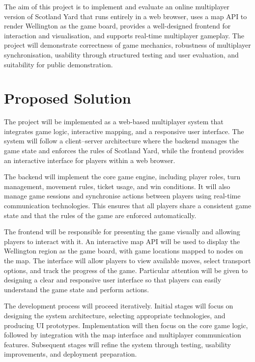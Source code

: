 \documentclass[11pt, a4paper, twoside, openright]{article}
\begin{document}
	The aim of this project is to implement and evaluate an online multiplayer version of Scotland Yard that runs entirely in a web browser, uses a map API to render Wellington as the game board, provides a well-designed frontend for interaction and visualisation, and supports real-time multiplayer gameplay. The project will demonstrate correctness of game mechanics, robustness of multiplayer synchronisation, usability through structured testing and user evaluation, and suitability for public demonstration.
	
	\section{Proposed Solution}
	
	The project will be implemented as a web-based multiplayer system that integrates game logic, interactive mapping, and a responsive user interface. The system will follow a client–server architecture where the backend manages the game state and enforces the rules of Scotland Yard, while the frontend provides an interactive interface for players within a web browser.
	
	The backend will implement the core game engine, including player roles, turn management, movement rules, ticket usage, and win conditions. It will also manage game sessions and synchronise actions between players using real-time communication technologies. This ensures that all players share a consistent game state and that the rules of the game are enforced automatically.
	
	The frontend will be responsible for presenting the game visually and allowing players to interact with it. An interactive map API will be used to display the Wellington region as the game board, with game locations mapped to nodes on the map. The interface will allow players to view available moves, select transport options, and track the progress of the game. Particular attention will be given to designing a clear and responsive user interface so that players can easily understand the game state and perform actions.
	
	The development process will proceed iteratively. Initial stages will focus on designing the system architecture, selecting appropriate technologies, and producing UI prototypes. Implementation will then focus on the core game logic, followed by integration with the map interface and multiplayer communication features. Subsequent stages will refine the system through testing, usability improvements, and deployment preparation.
	
\end{document}
